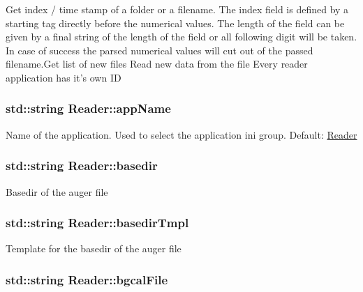 Get index / time stamp of a folder or a filename. The index field is defined by a starting tag directly before the numerical values. The length of the field can be given by a final string of the length of the field or all following digit will be taken. In case of success the parsed numerical values will cut out of the passed filename.\-Get list of new files Read new data from the file Every reader application has it's own I\-D \hypertarget{classReader_a6207e38c6bc804dabb6b086405c8231d}{
\subsubsection[{app\-Name}]{\setlength{\rightskip}{0pt plus 5cm}std\-::string Reader\-::app\-Name\hspace{0.3cm}{\ttfamily [private]}}}\label{classReader_a6207e38c6bc804dabb6b086405c8231d}
Name of the application. Used to select the application ini group. Default\-: \hyperlink{classReader}{Reader} \hypertarget{classReader_ace3793e1d270276c63e9689e59a6cb23}{
\subsubsection[{basedir}]{\setlength{\rightskip}{0pt plus 5cm}std\-::string Reader\-::basedir\hspace{0.3cm}{\ttfamily [private]}}}\label{classReader_ace3793e1d270276c63e9689e59a6cb23}
Basedir of the auger file \hypertarget{classReader_a5357e56eb1aea6d31962a3ac034b4d0b}{
\subsubsection[{basedir\-Tmpl}]{\setlength{\rightskip}{0pt plus 5cm}std\-::string Reader\-::basedir\-Tmpl\hspace{0.3cm}{\ttfamily [private]}}}\label{classReader_a5357e56eb1aea6d31962a3ac034b4d0b}
Template for the basedir of the auger file \hypertarget{classReader_a097598eeea105530aa64222c8bf6d828}{
\subsubsection[{bgcal\-File}]{\setlength{\rightskip}{0pt plus 5cm}std\-::string Reader\-::bgcal\-File\hspace{0.3cm}{\ttfamily [private]}}}\label{classReader_a097598eeea105530aa64222c8bf6d828}
